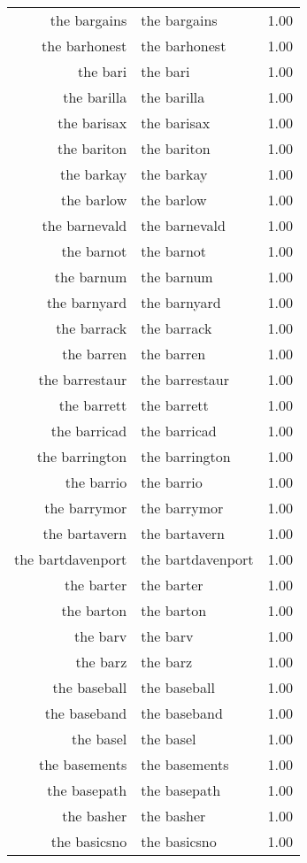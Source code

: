 \begin{table}[ht]
\begin{tabular}{rlr}
  the bargains & the bargains & 1.00 \\ 
  the barhonest & the barhonest & 1.00 \\ 
  the bari & the bari & 1.00 \\ 
  the barilla & the barilla & 1.00 \\ 
  the barisax & the barisax & 1.00 \\ 
  the bariton & the bariton & 1.00 \\ 
  the barkay & the barkay & 1.00 \\ 
  the barlow & the barlow & 1.00 \\ 
  the barnevald & the barnevald & 1.00 \\ 
  the barnot & the barnot & 1.00 \\ 
  the barnum & the barnum & 1.00 \\ 
  the barnyard & the barnyard & 1.00 \\ 
  the barrack & the barrack & 1.00 \\ 
  the barren & the barren & 1.00 \\ 
  the barrestaur & the barrestaur & 1.00 \\ 
  the barrett & the barrett & 1.00 \\ 
  the barricad & the barricad & 1.00 \\ 
  the barrington & the barrington & 1.00 \\ 
  the barrio & the barrio & 1.00 \\ 
  the barrymor & the barrymor & 1.00 \\ 
  the bartavern & the bartavern & 1.00 \\ 
  the bartdavenport & the bartdavenport & 1.00 \\ 
  the barter & the barter & 1.00 \\ 
  the barton & the barton & 1.00 \\ 
  the barv & the barv & 1.00 \\ 
  the barz & the barz & 1.00 \\ 
  the baseball & the baseball & 1.00 \\ 
  the baseband & the baseband & 1.00 \\ 
  the basel & the basel & 1.00 \\ 
  the basements & the basements & 1.00 \\ 
  the basepath & the basepath & 1.00 \\ 
  the basher & the basher & 1.00 \\ 
  the basicsno & the basicsno & 1.00 \\ 

\end{tabular}
\end{table}
